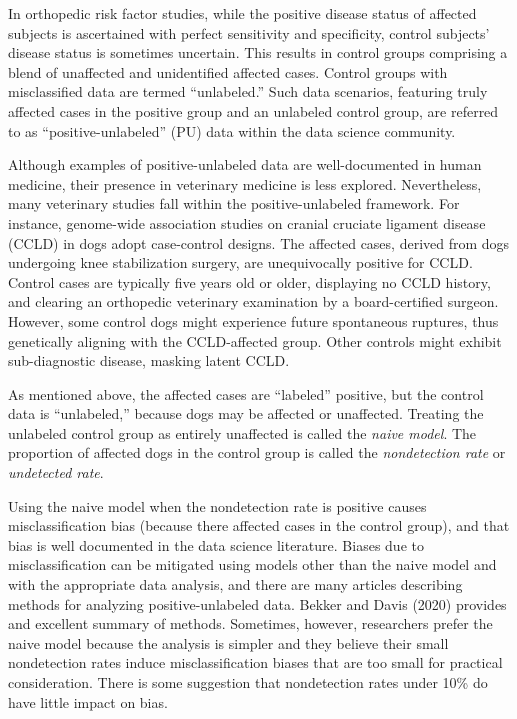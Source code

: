 \documentclass[
]{article}
\begin{document}
In orthopedic risk factor studies, while the positive disease status of
affected subjects is ascertained with perfect sensitivity and
specificity, control subjects' disease status is sometimes uncertain.
This results in control groups comprising a blend of unaffected and
unidentified affected cases. Control groups with misclassified data are
termed ``unlabeled.'' Such data scenarios, featuring truly affected
cases in the positive group and an unlabeled control group, are referred
to as ``positive-unlabeled'' (PU) data within the data science
community.

Although examples of positive-unlabeled data are well-documented in
human medicine, their presence in veterinary medicine is less explored.
Nevertheless, many veterinary studies fall within the positive-unlabeled
framework. For instance, genome-wide association studies on cranial
cruciate ligament disease (CCLD) in dogs adopt case-control designs. The
affected cases, derived from dogs undergoing knee stabilization surgery,
are unequivocally positive for CCLD. Control cases are typically five
years old or older, displaying no CCLD history, and clearing an
orthopedic veterinary examination by a board-certified surgeon. However,
some control dogs might experience future spontaneous ruptures, thus
genetically aligning with the CCLD-affected group. Other controls might
exhibit sub-diagnostic disease, masking latent CCLD.

As mentioned above, the affected cases are ``labeled'' positive, but the
control data is ``unlabeled,'' because dogs may be affected or
unaffected. Treating the unlabeled control group as entirely unaffected
is called the \emph{naive model}. The proportion of affected dogs in the
control group is called the \emph{nondetection rate} or \emph{undetected
rate}.

Using the naive model when the nondetection rate is positive causes
misclassification bias (because there affected cases in the control
group), and that bias is well documented in the data science literature.
\cite{bd20} Biases due to misclassification can be mitigated using
models other than the naive model and with the appropriate data
analysis, and there are many articles describing methods for analyzing
positive-unlabeled data. Bekker and Davis (2020) provides and excellent
summary of methods. \cite{bd20} Sometimes, however, researchers prefer
the naive model because the analysis is simpler and they believe their
small nondetection rates induce misclassification biases that are too
small for practical consideration. There is some suggestion that
nondetection rates under 10\% do have little impact on bias. \cite{bd20}
\end{document}

